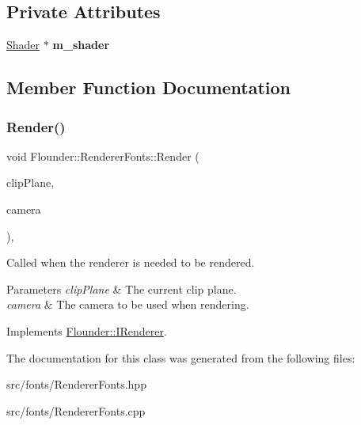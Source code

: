 \subsection*{Private Attributes}
\begin{DoxyCompactItemize}
\item 
\mbox{\label{class_flounder_1_1_renderer_fonts_a8853b8b1a7132b0563c80e98ffeb4f82}} 
\hyperlink{class_flounder_1_1_shader}{Shader} $\ast$ {\bfseries m\+\_\+shader}
\end{DoxyCompactItemize}


\subsection{Member Function Documentation}
\mbox{\label{class_flounder_1_1_renderer_fonts_a98049021a5e71c025ee9d38a23e07454}} 
\subsubsection{\texorpdfstring{Render()}{Render()}}
{\footnotesize\ttfamily void Flounder\+::\+Renderer\+Fonts\+::\+Render (\begin{DoxyParamCaption}\item[{const \hyperlink{class_flounder_1_1_vector4}{Vector4} \&}]{clip\+Plane,  }\item[{const \hyperlink{class_flounder_1_1_i_camera}{I\+Camera} \&}]{camera }\end{DoxyParamCaption})\hspace{0.3cm}{\ttfamily [override]}, {\ttfamily [virtual]}}



Called when the renderer is needed to be rendered. 


\begin{DoxyParams}{Parameters}
{\em clip\+Plane} & The current clip plane. \\
\hline
{\em camera} & The camera to be used when rendering. \\
\hline
\end{DoxyParams}


Implements \hyperlink{class_flounder_1_1_i_renderer_a4e86d6621f6f63442e1c07655afd9daa}{Flounder\+::\+I\+Renderer}.



The documentation for this class was generated from the following files\+:\begin{DoxyCompactItemize}
\item 
src/fonts/Renderer\+Fonts.\+hpp\item 
src/fonts/Renderer\+Fonts.\+cpp\end{DoxyCompactItemize}
